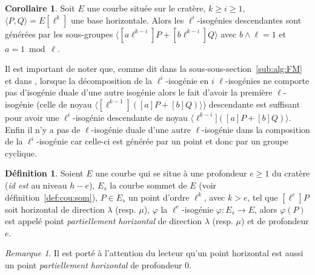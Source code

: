 \documentclass[10pt,a4paper]{book}
\theoremstyle{plain}
\theoremstyle{definition}
\theoremstyle{definition}
\newtheorem{cor}[thm]{Corollaire}
\theoremstyle{definition}
\theoremstyle{definition}
\newtheorem{defi}[thm]{Définition}
\theoremstyle{remark}
\newtheorem{rem}[thm]{Remarque}
\theoremstyle{remark}
\theoremstyle{definition}
\begin{document}
\begin{cor}
Soit $E$ une courbe située sur le cratère, $k\geqslant i \geqslant 1$, 
$\langle P, Q \rangle= E[\ell^k]$ une base horizontale. Alors les 
$\ell^i$-isogénies descendantes sont générées par les sous-groupes 
$\langle [a\ell^{k-i}]P+ [b\ell^{k-i}]Q \rangle$ avec $b \wedge \ell =1$ et 
$a = 1 \bmod \ell$.
\end{cor}
Il est important de noter que, comme dit dans la sous-sous-section~\ref{sub:alg:FM} 
et dans \cite{FouquetMorain02}, lorsque la décomposition de la 
$\ell^i$-isogénie en $i$ $\ell$-isogénies ne comporte pas d'isogénie duale d'une 
autre isogénie alors le fait d'avoir la première $\ell$-isogénie (celle de noyau
$\langle [\ell^{k-1}]([a]P+[b]Q) \rangle$) descendante est suffisant pour avoir
une $\ell^{i}$-isogénie descendante de noyau $\langle \ell^{k-i}]([a]P+[b]Q) 
\rangle$. Enfin il n'y a pas de $\ell$-isogénie duale d'une autre 
$\ell$-isogénie dans la composition de la $\ell^i$-isogénie car celle-ci est 
générée par un point et donc par un groupe cyclique.


\begin{defi}
\label{def:par:hor}
Soient $E$ une courbe qui se situe à une profondeur $e \geqslant 1$ du cratère 
(\emph{id est} au niveau $h-e$),
$E_s$ la courbe sommet de $E$ (voir définition~\ref{def:cou:som}), $P \in E_s$ 
un point d'ordre $\ell^k$, avec $k>e$, tel que $[\ell^e]P$ soit horizontal de 
direction $\lambda$ (resp. $\mu$), $\varphi$ la $\ell^e$-isogénie $\varphi:
E_s \rightarrow E$, alors $\varphi(P)$ est appelé point \emph{partiellement 
horizontal} de direction $\lambda$ (resp. $\mu$) et de profondeur $e$.
\end{defi}

\begin{rem}
Il est porté à l'attention du lecteur qu'un point horizontal est aussi un point
\emph{partiellement horizontal} de profondeur $0$.
\end{rem}
\end{document}
